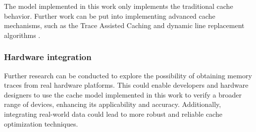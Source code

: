 The model implemented in this work only implements the traditional cache behavior. Further work can be put into implementing advanced cache mechanisms, such as
the Trace Assisted Caching \cite{usingtrace} and dynamic line replacement algorithms \cite{dynamiceviction}.

\subsubsection*{Hardware integration}

Further research can be conducted to explore the possibility of obtaining memory traces from real hardware platforms. This could enable developers and hardware designers to use the
cache model implemented in this work to verify a broader range of devices, enhancing its applicability and accuracy. Additionally, integrating real-world data could lead to more
robust and reliable cache optimization techniques.

